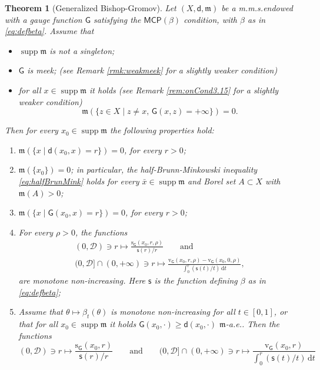 \documentclass[11pt,a4paper]{article}
\theoremstyle{plain}
\newtheorem{theorem}{Theorem}[section]
\theoremstyle{definition}
\theoremstyle{remark}
\numberwithin{equation}{section}
\DeclareMathOperator{\supp}{\mathrm{supp}}
\newcommand{\MCP}{\mathsf{MCP}}
\newcommand{\cD}{\mathcal{D}}
\newcommand{\sfs}{\mathsf{s}}
\newcommand{\rv}{\mathrm{v}}
\newcommand{\rs}{\mathrm{s}}
\newcommand{\di}{\mathrm{d}}
\newcommand{\mm}{\mathfrak m}
\newcommand{\sfd}{\mathsf d}
\newcommand{\sfG}{\mathsf G}
\begin{document}
\begin{theorem}[Generalized Bishop-Gromov] \label{thm:BG1}
Let $(X,\sfd,\mm)$ be a m.m.s.\@ endowed with a gauge function $\sfG$ satisfying the $\MCP(\beta)$ condition, with $\beta$ as in \eqref{eq:defbeta}.  Assume that
\begin{itemize}
\item $\supp \mm$ is not a singleton;
\item $\sfG$ is meek;  (see Remark \ref{rmk:weakmeek} for a slightly weaker condition)
\item for all $x\in\supp\mm$ it holds (see Remark \ref{rem:onCond3.15} for a slightly weaker condition)
\begin{equation}\label{eq:Gfinite}
\mm(\{z\in X\mid  z\neq x,\, \sfG(x, z)=+\infty\})=0.
\end{equation}
\end{itemize}
Then for every $x_0\in\supp\mm$ the following properties hold:
\begin{enumerate}[label = (\roman*)]
\item \label{i:BG1} $\mm(\{x \mid \sfd(x_0,x) = r\})=0$, for every $r >0 $;
\item \label{i:BG2} $\mm(\{x_0\})=0$; in particular, the half-Brunn-Minkowski inequality \eqref{eq:halfBrunMink} holds for every $\bar{x}\in \supp\mm$ and Borel set $A\subset X$ with $\mm(A)>0$;
\item \label{i:BG3} $\mm(\{x \mid \sfG(x_0,x) = r\})=0$, for every $r >0 $;
\item \label{i:BG4} For every $\rho>0$, the functions
\begin{multline}\label{eq:BisGr}
(0,\cD)\ni r \mapsto \frac{\rs_{\sfG}(x_{0}, r,\rho)}{\sfs(r)/r}  \qquad \text{and} \\ (0, \cD]\cap (0,+\infty)\ni r \mapsto\frac{\rv_{\sfG}(x_{0}, r,\rho)-\rv_{\sfG}(x_{0}, 0,\rho)}{\int_{0}^{r} (\sfs(t)/t) \, \di t},
\end{multline}
are monotone non-increasing. Here $\sfs$ is the function defining $\beta$ as in \eqref{eq:defbeta};
\item \label{i:BG5} Assume that $\theta\mapsto \beta_t(\theta)$ is monotone non-increasing for all $t\in [0,1]$, or that for all $x_0\in\supp\mm$ it holds $\sfG(x_0,\cdot) \geq \sfd(x_0,\cdot)$ $\mm$-a.e.. Then the functions
\begin{equation}\label{eq:BisGr2}
(0,\cD)\ni r \mapsto \frac{\rs_{\sfG}(x_{0}, r)}{\sfs(r)/r}  \qquad \text{and} \qquad (0, \cD]\cap (0,+\infty)\ni r \mapsto\frac{\rv_{\sfG}(x_{0}, r)}{\int_{0}^{r} (\sfs(t)/t) \, \di t}

\end{equation}
\end{enumerate}
\end{theorem}
\end{document}
